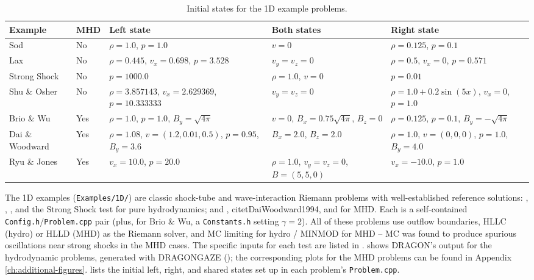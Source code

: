\documentclass[11pt]{report}
\newcommand{\bash}[1]{\lstinline[language=bash]{#1}}
\begin{document}
\begin{table}[htbp]
\centering
\footnotesize
\setlength{\tabcolsep}{4pt}
\caption{Initial states for the 1D example problems.}\label{tab:1D}
\label{tab:1d-examples-ic}
\begin{tabular}{@{}ll>{\raggedright\arraybackslash}p{4.3cm}>{\raggedright\arraybackslash}p{3.0cm}>{\raggedright\arraybackslash}p{4.3cm}@{}}
\toprule
Example & MHD & Left state & Both states & Right state \\
\midrule
Sod & No & \mbox{$\rho = 1.0$}, \mbox{$p = 1.0$} & \mbox{$v = 0$} & \mbox{$\rho = 0.125$}, \mbox{$p = 0.1$} \\
Lax & No & \mbox{$\rho = 0.445$}, \mbox{$v_x = 0.698$}, \mbox{$p = 3.528$} & \mbox{$v_y = v_z = 0$} & \mbox{$\rho = 0.5$}, \mbox{$v_x = 0$}, \mbox{$p = 0.571$} \\
Strong Shock & No & \mbox{$p = 1000.0$} & \mbox{$\rho = 1.0$}, \mbox{$v = 0$} & \mbox{$p = 0.01$} \\
Shu \& Osher & No & \mbox{$\rho = 3.857143$}, \mbox{$v_x = 2.629369$}, \mbox{$p = 10.333333$} & \mbox{$v_y = v_z = 0$} & \mbox{$\rho = 1.0 + 0.2\sin(5x)$}, \mbox{$v_x = 0$}, \mbox{$p = 1.0$} \\
Brio \& Wu & Yes & \mbox{$\rho = 1.0$}, \mbox{$p = 1.0$}, \mbox{$B_y = \sqrt{4\pi}$} & \mbox{$v = 0$}, \mbox{$B_x = 0.75\sqrt{4\pi}$}, \mbox{$B_z = 0$} & \mbox{$\rho = 0.125$}, \mbox{$p = 0.1$}, \mbox{$B_y = -\sqrt{4\pi}$} \\
Dai \& Woodward & Yes & \mbox{$\rho = 1.08$}, \mbox{$v = (1.2, 0.01, 0.5)$}, \mbox{$p = 0.95$}, \mbox{$B_y = 3.6$} & \mbox{$B_x = 2.0$}, \mbox{$B_z = 2.0$} & \mbox{$\rho = 1.0$}, \mbox{$v = (0,0,0)$}, \mbox{$p = 1.0$}, \mbox{$B_y = 4.0$} \\
Ryu \& Jones & Yes & \mbox{$v_x = 10.0$}, \mbox{$p = 20.0$} & \mbox{$\rho = 1.0$}, \mbox{$v_y = v_z = 0$}, \mbox{$B = (5,5,0)$} & \mbox{$v_x = -10.0$}, \mbox{$p = 1.0$} \\
\bottomrule
\end{tabular}
\end{table}

The 1D examples (\bash{Examples/1D/}) are classic shock-tube and wave-interaction Riemann problems with well-established reference solutions:  \citet{Sod1978},  \citet{Lax1954},  \citet{ShuOsher1989}, and the Strong Shock test for pure hydrodynamics; and \citet{BrioWu1988}, citet{DaiWoodward1994}, and \citet{RyuJones1995} for MHD. Each is a self-contained \bash{Config.h}/\bash{Problem.cpp} pair (plus, for Brio \& Wu, a \bash{Constants.h} setting $\gamma = 2$). All of these problems use outflow boundaries, HLLC (hydro) or HLLD (MHD) as the Riemann solver, and MC limiting for hydro / MINMOD for MHD -- MC was found to produce spurious oscillations near strong shocks in the MHD cases. The specific inputs  for each test are listed in .  shows DRAGON's output for the hydrodynamic problems, generated with DRAGONGAZE (); the corresponding plots for the MHD problems can be found in Appendix \ref{ch:additional-figures}.  lists the initial left, right, and shared states set up in each problem's \bash{Problem.cpp}.
\end{document}
